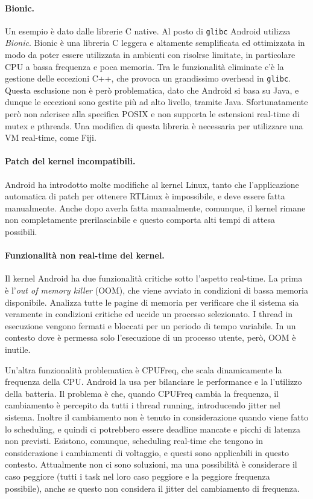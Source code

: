 \paragraph{Bionic.} Un esempio è dato dalle librerie C native. Al posto di \texttt{glibc} Android utilizza \textit{Bionic}. Bionic è una libreria C leggera e altamente semplificata ed ottimizzata in modo da poter essere utilizzata in ambienti con risolrse limitate, in particolare CPU a bassa frequenza e poca memoria. Tra le funzionalità eliminate c'è la gestione delle eccezioni C++, che provoca un grandissimo overhead in \texttt{glibc}. Questa esclusione non è però problematica, dato che Android si basa su Java, e dunque le eccezioni sono gestite più ad alto livello, tramite Java. Sfortunatamente però non aderisce alla specifica POSIX e non supporta le estensioni real-time di mutex e pthreads. Una modifica di questa libreria è necessaria per utilizzare una VM real-time, come Fiji.

\paragraph{Patch del kernel incompatibili.} Android ha introdotto molte modifiche al kernel Linux, tanto che l'applicazione automatica di patch per ottenere RTLinux è impossibile, e deve essere fatta manualmente. Anche dopo averla fatta manualmente, comunque, il kernel rimane non completamente prerilasciabile e questo comporta alti tempi di attesa possibili. 

\paragraph{Funzionalità non real-time del kernel.} Il kernel Android ha due funzionalità critiche sotto l'aspetto real-time. La prima è l'\textit{out of memory killer} (OOM), che viene avviato in condizioni di bassa memoria disponibile. Analizza tutte le pagine di memoria per verificare che il sistema sia veramente in condizioni critiche ed uccide un processo selezionato. I thread in esecuzione vengono fermati e bloccati per un periodo di tempo variabile. In un contesto dove è permessa solo l'esecuzione di un processo utente, però, OOM è inutile.

Un'altra funzionalità problematica è CPUFreq, che scala dinamicamente la frequenza della CPU. Android la usa per bilanciare le performance e la l'utilizzo della batteria. Il problema è che, quando CPUFreq cambia la frequenza, il cambiamento è percepito da tutti i thread running, introducendo jitter nel sistema. Inoltre il cambiamento non è tenuto in considerazione quando viene fatto lo scheduling, e quindi ci potrebbero essere deadline mancate e picchi di latenza non previsti. Esistono, comunque, scheduling real-time che tengono in considerazione i cambiamenti di voltaggio, e questi sono applicabili in questo contesto. Attualmente non ci sono soluzioni, ma una possibilità è considerare il caso peggiore (tutti i task nel loro caso peggiore e la peggiore frequenza possibile), anche se questo non considera il jitter del cambiamento di frequenza.

